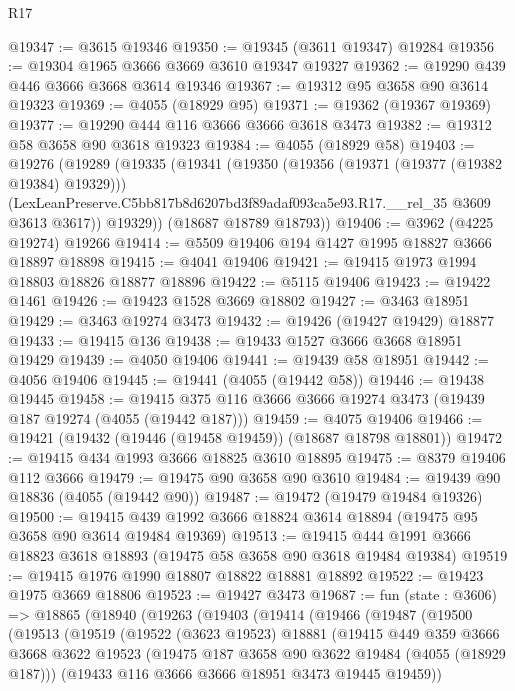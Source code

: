 \begin{lexlean}{R17}
\begin{coremodule}
@19347 := @3615 @19346
@19350 := @19345 (@3611 @19347) @19284
@19356 := @19304 @1965 @3666 @3669 @3610 @19347 @19327
@19362 := @19290 @439 @446 @3666 @3668 @3614 @19346
@19367 := @19312 @95 @3658 @90 @3614 @19323
@19369 := @4055 (@18929 @95)
@19371 := @19362 (@19367 @19369)
@19377 := @19290 @444 @116 @3666 @3666 @3618 @3473
@19382 := @19312 @58 @3658 @90 @3618 @19323
@19384 := @4055 (@18929 @58)
@19403 := @19276
    (@19289
      (@19335
        (@19341
          (@19350
            (@19356 (@19371 (@19377 (@19382 @19384) @19329)))
            (LexLeanPreserve.C5bb817b8d6207bd3f89adaf093ca5e93.R17.__rel_35 @3609 @3613 @3617))
          @19329))
      (@18687 @18789 @18793))
@19406 := @3962 (@4225 @19274) @19266
@19414 := @5509 @19406 @194 @1427 @1995 @18827 @3666 @18897 @18898
@19415 := @4041 @19406
@19421 := @19415 @1973 @1994 @18803 @18826 @18877 @18896
@19422 := @5115 @19406
@19423 := @19422 @1461
@19426 := @19423 @1528 @3669 @18802
@19427 := @3463 @18951
@19429 := @3463 @19274 @3473
@19432 := @19426 (@19427 @19429) @18877
@19433 := @19415 @136
@19438 := @19433 @1527 @3666 @3668 @18951 @19429
@19439 := @4050 @19406
@19441 := @19439 @58 @18951
@19442 := @4056 @19406
@19445 := @19441 (@4055 (@19442 @58))
@19446 := @19438 @19445
@19458 := @19415 @375 @116 @3666 @3666 @19274 @3473 (@19439 @187 @19274 (@4055 (@19442 @187)))
@19459 := @4075 @19406
@19466 := @19421 (@19432 (@19446 (@19458 @19459)) (@18687 @18798 @18801))
@19472 := @19415 @434 @1993 @3666 @18825 @3610 @18895
@19475 := @8379 @19406 @112 @3666
@19479 := @19475 @90 @3658 @90 @3610
@19484 := @19439 @90 @18836 (@4055 (@19442 @90))
@19487 := @19472 (@19479 @19484 @19326)
@19500 := @19415 @439 @1992 @3666 @18824 @3614 @18894 (@19475 @95 @3658 @90 @3614 @19484 @19369)
@19513 := @19415 @444 @1991 @3666 @18823 @3618 @18893 (@19475 @58 @3658 @90 @3618 @19484 @19384)
@19519 := @19415 @1976 @1990 @18807 @18822 @18881 @18892
@19522 := @19423 @1975 @3669 @18806
@19523 := @19427 @3473
@19687 := fun (state : @3606) =>
  @18865
    (@18940
      (@19263
        (@19403
          (@19414
            (@19466
              (@19487
                (@19500
                  (@19513
                    (@19519
                      (@19522
                        (@3623 @19523)
                        @18881
                        (@19415
                          @449
                          @359
                          @3666
                          @3668
                          @3622
                          @19523
                          (@19475 @187 @3658 @90 @3622 @19484 (@4055 (@18929 @187)))
                          (@19433 @116 @3666 @3666 @18951 @3473 @19445 @19459))

\end{coremodule}
\end{lexlean}
